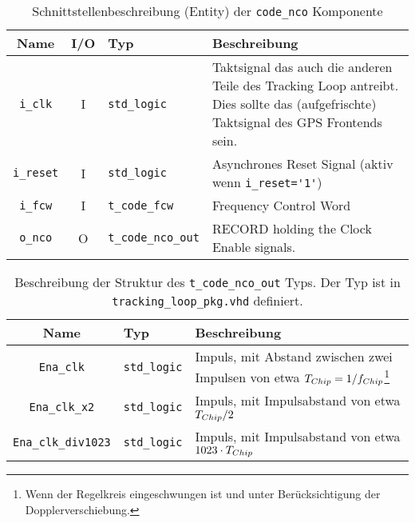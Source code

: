 \begin{table}[htbp]
    \ttabbox
    {
        \caption[Code NCO Schnittstelle]{Schnittstellenbeschreibung (Entity) der \lstinline$code_nco$ Komponente}
        \label{TabCodeNCO_Entity}
    }
    {
    \begin{tabular}{c c  p{2cm} p{6cm}}
        \toprule
        Name                    & I/O  & Typ                               & Beschreibung \\
        \midrule
        \lstinline$i_clk$       & I         & \lstinline$std_logic$             & Taktsignal das auch die anderen Teile des Tracking Loop antreibt. Dies sollte das (aufgefrischte) Taktsignal des GPS Frontends sein.\\
        \lstinline$i_reset$     & I         & \lstinline$std_logic$             & Asynchrones Reset Signal (aktiv wenn \lstinline$i_reset='1'$) \\
        \lstinline$i_fcw$    & I         & \lstinline$t_code_fcw$             & Frequency Control Word \\
        \lstinline$o_nco$       & O         & \lstinline$t_code_nco_out$ & RECORD holding the Clock Enable signals. \\
        \bottomrule
    \end{tabular}
}
\end{table}

\begin{table}[htbp]
    \ttabbox
    {
        \caption[Typdefinition Code NCO Ausgangssignal]{Beschreibung der Struktur des \lstinline$t_code_nco_out$ Typs. Der Typ ist in \lstinline$tracking_loop_pkg.vhd$ definiert.}
        \label{TabCodeNCO_Type}
    }
    {
    \begin{tabular}{c  p{2cm} p{6cm}}
        \toprule
        Name				& Typ                   & Beschreibung \\
        \midrule
        \lstinline$Ena_clk$		& \lstinline$std_logic$	& Impuls, mit Abstand zwischen zwei Impulsen von etwa ${T}_{Chip}=1/f_{Chip}$\footnote{Wenn der Regelkreis eingeschwungen ist und unter Berücksichtigung der Dopplerverschiebung.} \\
        \lstinline$Ena_clk_x2$		& \lstinline$std_logic$	& Impuls, mit Impulsabstand von etwa ${T}_{Chip}/2$ \\
        \lstinline$Ena_clk_div1023$	& \lstinline$std_logic$	& Impuls, mit Impulsabstand von etwa $1023\cdot {T}_{Chip}$ \\
        \bottomrule
    \end{tabular}
}
\end{table}


